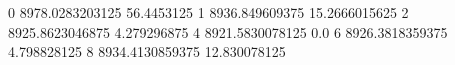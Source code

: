 0 8978.0283203125 56.4453125
1 8936.849609375 15.2666015625
2 8925.8623046875 4.279296875
4 8921.5830078125 0.0
6 8926.3818359375 4.798828125
8 8934.4130859375 12.830078125
